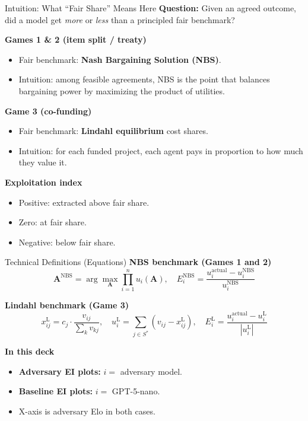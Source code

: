 \documentclass[aspectratio=169]{beamer}
\begin{document}
\begin{frame}{Intuition: What ``Fair Share'' Means Here}
\textbf{Question:} Given an agreed outcome, did a model get \emph{more} or \emph{less} than a principled fair benchmark?

\vspace{0.3cm}
\textbf{Games 1 \& 2 (item split / treaty)}
\begin{itemize}
    \item Fair benchmark: \textbf{Nash Bargaining Solution (NBS)}.
    \item Intuition: among feasible agreements, NBS is the point that balances bargaining power by maximizing the product of utilities.
\end{itemize}

\textbf{Game 3 (co-funding)}
\begin{itemize}
    \item Fair benchmark: \textbf{Lindahl equilibrium} cost shares.
    \item Intuition: for each funded project, each agent pays in proportion to how much they value it.
\end{itemize}

\textbf{Exploitation index}
\begin{itemize}
    \item Positive: extracted above fair share.
    \item Zero: at fair share.
    \item Negative: below fair share.
\end{itemize}
\end{frame}

\begin{frame}{Technical Definitions (Equations)}
\textbf{NBS benchmark (Games 1 and 2)}
\[
\mathbf{A}^{\mathrm{NBS}}=\arg\max_{\mathbf{A}}\prod_{i=1}^{n}u_i(\mathbf{A}), \quad
E_i^{\mathrm{NBS}}=\frac{u_i^{\mathrm{actual}}-u_i^{\mathrm{NBS}}}{u_i^{\mathrm{NBS}}}
\]

\textbf{Lindahl benchmark (Game 3)}
\[
x_{ij}^{\mathrm{L}}=c_j\cdot\frac{v_{ij}}{\sum_k v_{kj}}, \quad
u_i^{\mathrm{L}}=\sum_{j\in S^*}\left(v_{ij}-x_{ij}^{\mathrm{L}}\right), \quad
E_i^{\mathrm{L}}=\frac{u_i^{\mathrm{actual}}-u_i^{\mathrm{L}}}{|u_i^{\mathrm{L}}|}
\]

\textbf{In this deck}
\begin{itemize}
    \item \textbf{Adversary EI plots:} $i =$ adversary model.
    \item \textbf{Baseline EI plots:} $i =$ GPT-5-nano.
    \item X-axis is adversary Elo in both cases.
\end{itemize}
\end{frame}
\end{document}
